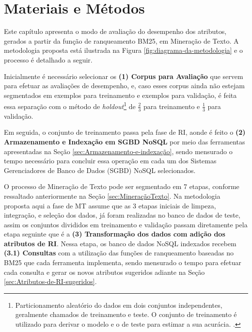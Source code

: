 \chapter{Materiais e Métodos} \label{ch:MateriaisMétodos} %
    Este capítulo apresenta o modo de avaliação do desempenho dos atributos, gerados a partir da função de ranqueamento BM25, em Mineração de Texto.
    A metodologia proposta está ilustrada na Figura \ref{fig:diagrama-da-metodologia} e o processo é detalhado a seguir.
    
    
    
    Inicialmente é necessário selecionar os \textbf{(1) Corpus para Avaliação} que servem para efetuar as avaliações de desempenho, e, caso esses corpus ainda não estejam segmentados em exemplos para treinamento e exemplos para validação, é feita essa separação com o método de \textit{holdout}\footnote{Particionamento aleatório do dados em dois conjuntos independentes, geralmente chamados de treinamento e teste. O conjunto de treinamento é utilizado para derivar o modelo e o de teste para estimar a sua acurácia. \cite[p.~370]{Han:2011:DMC:1972541}.} de $\frac{2}{3}$ para treinamento e $\frac{1}{3}$ para validação.
    
    Em seguida, o conjunto de treinamento passa pela fase de RI, aonde é feito o \textbf{(2) Armazenamento e Indexação em  SGBD NoSQL} por meio das ferramentas apresentadas na Seção  \ref{sec:Armazenamento-e-indexação}, sendo mensurado o tempo necessário para concluir essa operação em cada um dos Sistemas Gerenciadores de Banco de Dados (SGBD) NoSQL selecionados.
    
    O processo de Mineração de Texto pode ser segmentado em 7 etapas, conforme ressaltado anteriormente na Seção \ref{sec:MineraçãoTexto}.
    Na metodologia proposta aqui a fase de MT assume que as 3 etapas iniciais de limpeza, integração, e seleção dos dados, já foram realizadas no banco de dados de teste, assim os conjuntos divididos em treinamento e validação passam diretamente pela etapa seguinte que é a \textbf{(3) Transformação dos dados com adição dos atributos de RI}.
    Nessa etapa, os banco de dados NoSQL indexados recebem \textbf{(3.1) Consultas} com a utilização das funções de ranqueamento baseadas no BM25 que cada ferramenta implementa, sendo mensurado o tempo para efetuar cada consulta e gerar os novos atributos sugeridos adiante na Seção \ref{sec:Atributos-de-RI-sugeridos}.
    
